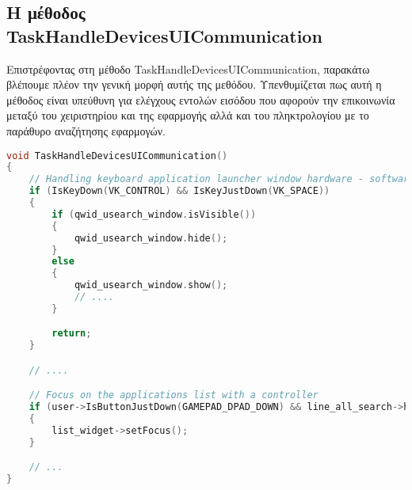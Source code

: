 \subsection{Η μέθοδος TaskHandleDevicesUICommunication}
Επιστρέφοντας στη μέθοδο TaskHandleDevicesUICommunication, παρακάτω βλέπουμε πλέον την γενική μορφή αυτής της μεθόδου.
Υπενθυμίζεται πως αυτή η μέθοδος είναι υπεύθυνη για ελέγχους εντολών εισόδου που αφορούν την επικοινωνία μεταξύ
του χειριστηρίου και της εφαρμογής αλλά και του πληκτρολογίου με το παράθυρο αναζήτησης εφαρμογών.




\begin{lstlisting}[language=C++, style=cppstyle]
void TaskHandleDevicesUICommunication()
{
    // Handling keyboard application launcher window hardware - software communication
    if (IsKeyDown(VK_CONTROL) && IsKeyJustDown(VK_SPACE))
    {
        if (qwid_usearch_window.isVisible())
        {
            qwid_usearch_window.hide();
        }
        else
        {
            qwid_usearch_window.show();
            // ....
        }

        return;
    }

    // ....

    // Focus on the applications list with a controller
    if (user->IsButtonJustDown(GAMEPAD_DPAD_DOWN) && line_all_search->hasFocus())
    {
        list_widget->setFocus();
    }

    // ...
}
\end{lstlisting}

